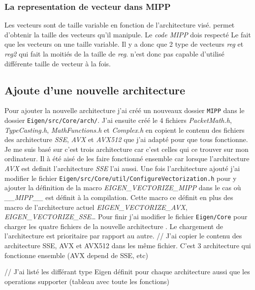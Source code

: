\subsubsection{La representation de vecteur dans MIPP}
{
  Les vecteurs sont de taille variable en fonction de l'architecture visé. \MIPP permet
  d'obtenir la taille des vecteurs qu'il manipule. Le \emph{code MIPP} dois respecté
  Le fait que les vecteurs on une taille variable. Il y a donc que 2 type de vecteurs
  \emph{reg} et \emph{reg2} qui fait la moitiés de la taille de \emph{reg}.
  \MIPP n'est donc pas capable d'utilisé différente taille de vecteur à la fois.
}

\subsection{Ajoute d'une nouvelle architecture \MIPP}

Pour ajouter la nouvelle architecture \MIPP j'ai créé un nouveaux dossier \verb|MIPP|
dans le dossier \verb|Eigen/src/Core/arch/|. J'ai ensuite créé le 4 fichiers
\emph{PacketMath.h}, \emph{TypeCasting.h}, \emph{MathFunctions.h} et \emph{Complex.h}
en copient le contenu des fichiers des architecture \emph{SSE}, \emph{AVX} et \emph{AVX512}
que j'ai adapté pour que tous fonctionne. Je me suis basé sur c'est trois architecture
car c'est celles qui ce trouver sur mon ordinateur. Il à été aisé de les faire fonctionné
ensemble car lorsque l'architecture \emph{AVX} est definit l'architecture \emph{SSE} l'ai
aussi.
Une fois l'architecture ajouté j'ai modifier le fichier
\verb|Eigen/src/Core/util/ConfigureVectorization.h| pour y ajouter la définition de la
macro \emph{EIGEN_VECTORIZE_MIPP} dans le cas où \emph{__MIPP__} est définit à la
compilation. Cette macro ce définit en plus des macro de l'architecture actuel
\emph{EIGEN_VECTORIZE_AVX}, \emph{EIGEN_VECTORIZE_SSE}\dots
Pour finir j'ai modifier le fichier \verb|Eigen/Core| pour charger les quatre fichiers
de la nouvelle architecture \MIPP. Le chargement de l'architecture \MIPP est prioritaire
par rapport au autre.
// J'ai copier le contenu des architecture SSE, AVX et AVX512 dans les même fichier.
C'est 3 architecture qui fonctionne ensemble (AVX depend de SSE, etc)

// J'ai listé les différant type Eigen définit pour chaque architecture aussi que les
operations supporter (tableau avec toute les fonctions)

